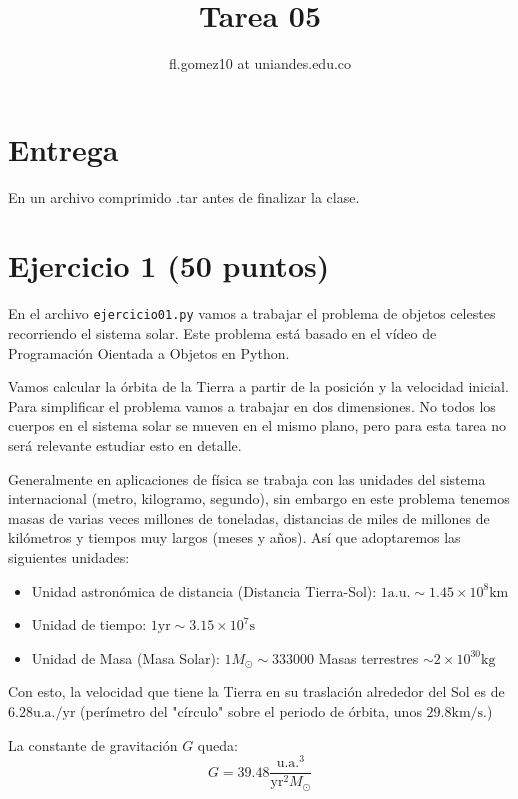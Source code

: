 \documentclass{article}
\title{Tarea 05}
\author{fl.gomez10 at uniandes.edu.co}
\begin{document}
\maketitle

\section*{Entrega}
En un archivo comprimido .tar antes de finalizar la clase. 

\section*{Ejercicio 1 (50 puntos)}

En el archivo \texttt{ejercicio01.py} vamos a trabajar el problema de objetos 
celestes recorriendo el sistema solar. Este problema está basado en el vídeo
de Programación Oientada a Objetos en Python.


Vamos calcular la órbita de la Tierra 
a partir de la posición y la velocidad inicial. Para simplificar el problema 
vamos a trabajar en dos dimensiones. No todos los cuerpos en el sistema solar 
se mueven en el mismo plano, pero para esta tarea no será relevante estudiar 
esto en detalle.

Generalmente en aplicaciones de física se trabaja con las unidades del sistema
internacional (metro, kilogramo, segundo), sin embargo en este problema tenemos
masas de varias veces millones de toneladas, distancias de miles de millones de 
kilómetros y tiempos muy largos (meses y años). Así que adoptaremos las 
siguientes unidades:


\begin{itemize}
    \item Unidad astronómica de distancia (Distancia Tierra-Sol):  
    $ 1 \mathrm{a.u.} \sim 1.45 \times 10 ^8\mathrm{km}$
    \item Unidad de tiempo: $1 \mathrm{yr} \sim 3.15 \times 10^7 \mathrm{s}$
    \item Unidad de Masa (Masa Solar): $1 M_{\odot} \sim 333000$ Masas terrestres
     $\sim 2 \times 10^{30} \mathrm{kg}$
\end{itemize}

Con esto, la velocidad que tiene la Tierra en su traslación alrededor del Sol es
de $6.28 \mathrm{u.a./yr}$ (perímetro del "círculo" sobre el periodo de órbita, 
unos $29.8 \mathrm{km/s}$.)

La constante de gravitación $G$ queda:
\[ G = 39.48   \frac{\mathrm{u.a.}^3}{ \mathrm{yr} ^ 2  M_\odot }\]
\end{document}
